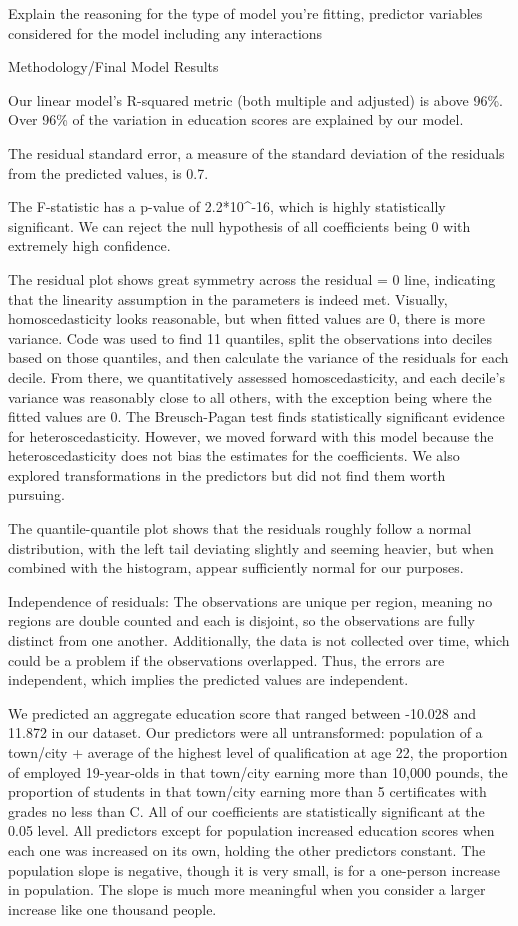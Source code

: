 \documentclass[
  letterpaper,
  DIV=11,
  numbers=noendperiod]{scrartcl}
\begin{document}
Explain the reasoning for the type of model you're fitting, predictor
variables considered for the model including any interactions

Methodology/Final Model Results

Our linear model's R-squared metric (both multiple and adjusted) is
above 96\%. Over 96\% of the variation in education scores are explained
by our model.~

The residual standard error, a measure of the standard deviation of the
residuals from the predicted values, is 0.7.

The F-statistic has a p-value of 2.2*10\^{}-16, which is highly
statistically significant. We can reject the null hypothesis of all
coefficients being 0 with extremely high confidence.

The residual plot shows great symmetry across the residual = 0 line,
indicating that the linearity assumption in the parameters is indeed
met. Visually, homoscedasticity looks reasonable, but when fitted values
are 0, there is more variance. Code was used to find 11 quantiles, split
the observations into deciles based on those quantiles, and then
calculate the variance of the residuals for each decile. From there, we
quantitatively assessed homoscedasticity, and each decile's variance was
reasonably close to all others, with the exception being where the
fitted values are 0. The Breusch-Pagan test finds statistically
significant evidence for heteroscedasticity. However, we moved forward
with this model because the heteroscedasticity does not bias the
estimates for the coefficients. We also explored transformations in the
predictors but did not find them worth pursuing.~

The quantile-quantile plot shows that the residuals roughly follow a
normal distribution, with the left tail deviating slightly and seeming
heavier, but when combined with the histogram, appear sufficiently
normal for our purposes.

Independence of residuals: The observations are unique per region,
meaning no regions are double counted and each is disjoint, so the
observations are fully distinct from one another. Additionally, the data
is not collected over time, which could be a problem if the observations
overlapped. Thus, the errors are independent, which implies the
predicted values are independent.~

We predicted an aggregate education score that ranged between -10.028
and 11.872 in our dataset. Our predictors were all untransformed:
population of a town/city + average of the highest level of
qualification at age 22, the proportion of employed 19-year-olds in that
town/city earning more than 10,000 pounds, the proportion of students in
that town/city earning more than 5 certificates with grades no less than
C. All of our coefficients are statistically significant at the 0.05
level. All predictors except for population increased education scores
when each one was increased on its own, holding the other predictors
constant. The population slope is negative, though it is very small, is
for a one-person increase in population. The slope is much more
meaningful when you consider a larger increase like one thousand
people.~~~
\end{document}
